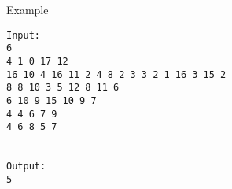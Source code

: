 Example
\begin{verbatim}
Input:
6
4 1 0 17 12
16 10 4 16 11 2 4 8 2 3 3 2 1 16 3 15 2
8 8 10 3 5 12 8 11 6
6 10 9 15 10 9 7
4 4 6 7 9
4 6 8 5 7


Output:
5
\end{verbatim}